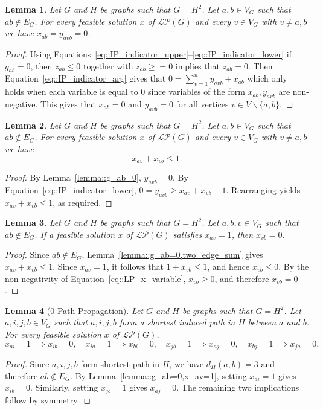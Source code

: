 \documentclass[11pt]{article}
\newtheorem{lemma}{Lemma}
\begin{document}
\begin{lemma} \label{lemma::g_ab=0}
  Let $G$ and $H$ be graphs such that $G = H^2$. Let $a,b \in V_G$ such that $ab \notin E_G$. For every feasible solution $x$ of $\mathcal{LP}(G)$ and every $v \in V_G$ with $v \neq a,b$ we have $x_{ab} = y_{avb} = 0$. 
\end{lemma}
\begin{proof}
  Using Equations~\eqref{eq::IP_indicator_upper}--\eqref{eq::IP_indicator_lower} if $g_{ab} = 0$, then $z_{ab} \leq 0$ together with $z_{ab} \geq = 0$ implies that $z_{ab} = 0$. Then Equation~\eqref{eq::IP_indicator_arg} gives that $\displaystyle 0 = \sum_{v = 1}^{n} y_{avb} + x_{ab}$ which only holds when each variable is equal to $0$ since variables of the form $x_{ab}, y_{avb}$ are non-negative. This gives that $x_{ab} = 0$ and $y_{avb} = 0$ for all vertices $v \in V \backslash \{a,b\}$. 
\end{proof}

\begin{lemma} \label{lemma::g_ab=0,two_edge_sum}
  Let $G$ and $H$ be graphs such that $G = H^2$. Let $a,b \in V_G$ such that $ab \notin E_G$. For every feasible solution $x$ of $\mathcal{LP}(G)$ and every $v \in V_G$ with $v \neq a,b$ we have
  \[
  x_{av} + x_{vb} \leq 1.
  \]
\end{lemma}
\begin{proof}
  By Lemma~\eqref{lemma::g_ab=0}, $y_{avb}=0$. By Equation~\eqref{eq::IP_indicator_lower}, $0 = y_{avb} \geq x_{av} + x_{vb} - 1$. Rearranging yields $x_{av} + x_{vb} \leq 1$, as required. 
\end{proof}

\begin{lemma} \label{lemma::g_ab=0,x_av=1}
  Let $G$ and $H$ be graphs such that $G = H^2$. Let $a,b,v \in V_G$ such that $ab \notin E_G$. If a feasible solution $x$ of $\mathcal{LP}(G)$ satisfies $x_{av}=1$, then $x_{vb}=0$.
\end{lemma}
\begin{proof}
  Since $ab \notin E_G$, Lemma~\eqref{lemma::g_ab=0,two_edge_sum} gives $x_{av}+x_{vb} \leq 1$. Since $x_{av}=1$, it follows that $1+x_{vb} \leq 1$, and hence $x_{vb} \leq 0$. By the non-negativity of Equation~\eqref{eq::LP_x_variable}, $x_{vb} \geq 0$, and therefore $x_{vb}=0$.
\end{proof}

\begin{lemma}[$0$ Path Propagation] \label{lemma::0_path_propagation}
  Let $G$ and $H$ be graphs such that $G = H^2$. Let $a,i,j,b \in V_G$ such that $a,i,j,b$ form a shortest induced path in $H$ between $a$ and $b$. For every feasible solution $x$ of $\mathcal{LP}(G)$,
  \[
  x_{ai}=1 \implies x_{ib}=0, \quad x_{ia}=1 \implies x_{bi}=0, \quad x_{jb}=1 \implies x_{aj}=0, \quad x_{bj}=1 \implies x_{ja}=0.
  \]
\end{lemma}
\begin{proof}
  Since $a,i,j,b$ form shortest path in $H$, we have $d_H(a,b)=3$ and therefore $ab \notin E_G$. By Lemma~\eqref{lemma::g_ab=0,x_av=1}, setting  $x_{ai}=1$ gives $x_{ib}=0.$ Similarly, setting $x_{jb}=1$ gives $ x_{aj}=0$. The remaining two implications follow by symmetry.
\end{proof}
\end{document}
